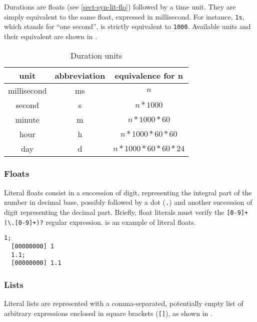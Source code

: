 \documentclass[openright,twoside,12pt]{report}
\begin{document}
Durations are floats (see \autoref{sect-syn-lit-flo}) followed by a
time unit. They are simply equivalent to the same float, expressed in
millisecond. For instance, \lstinline|1s|, which stands for ``one
second'', is strictly equivalent to \lstinline|1000|. Available units
and their equivalent are shown in .

\begin{table}[\floatpos]
  \caption{Duration units}
  \label{tab:durations}
  \centering
  \begin{tabular}{|c|c|c|}
    \hline
    unit        & abbreviation & equivalence for n         \\
    \hline
    millisecond & ms           & $n$                       \\
    second      & s            & $n * 1000$                \\
    minute      & m            & $n * 1000 * 60$           \\
    hour        & h            & $n * 1000 * 60 * 60$      \\
    day         & d            & $n * 1000 * 60 * 60 * 24$ \\
    \hline
  \end{tabular}
\end{table}

\subsubsection{Floats}
\label{sect:us-syn-lit-float}

Literal floats consist in a succession of digit, representing the
integral part of the number in decimal base, possibly followed by a
dot (\lstinline|.|) and another succession of digit representing the
decimal part. Briefly, float literals must verify the
\lstinline|[0-9]+(\.[0-9]+)?| regular expression. 
is an example of literal floats.

\begin{lstlisting}[caption=Literal floats,label=lst:literal-floats,float=\floatpos]
  1;
  [00000000] 1
  1.1;
  [00000000] 1.1
\end{lstlisting}

\subsubsection{Lists}
\label{sect:us-syn-lit-list}

Literal lists are represented with a comma-separated, potentially
empty list of arbitrary expressions enclosed in square brackets
(\lstinline|[]|), as shown in .
\end{document}
